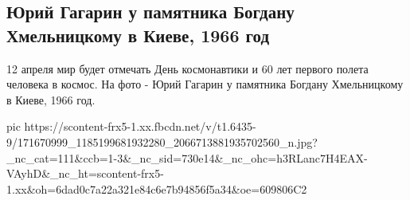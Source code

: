  
 
 
 
 
\subsection{Юрий Гагарин у памятника Богдану Хмельницкому в Киеве, 1966 год}
\label{sec:11_04_2021.fb.berdnik_miroslava.7.gagarin_kiev}

12 апреля мир будет отмечать День космонавтики и 60 лет первого полета человека в космос.
На фото - Юрий Гагарин у памятника Богдану Хмельницкому в Киеве, 1966 год.

\ifcmt
  pic https://scontent-frx5-1.xx.fbcdn.net/v/t1.6435-9/171670999_1185199681932280_2066713881935702560_n.jpg?_nc_cat=111&ccb=1-3&_nc_sid=730e14&_nc_ohc=h3RLanc7H4EAX-VAyhD&_nc_ht=scontent-frx5-1.xx&oh=6dad0c7a22a321e84c6e7b94856f5a34&oe=609806C2
\fi

